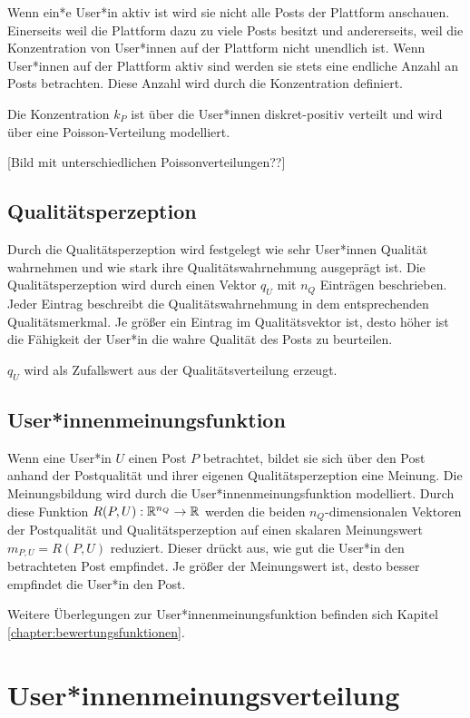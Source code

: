 Wenn ein*e User*in aktiv ist wird sie nicht alle Posts der Plattform anschauen. Einerseits weil die Plattform dazu zu viele Posts besitzt und andererseits, weil die Konzentration von User*innen auf der Plattform nicht unendlich ist. Wenn User*innen auf der Plattform aktiv sind werden sie stets eine endliche Anzahl an Posts betrachten. Diese Anzahl wird durch die Konzentration definiert.

Die Konzentration $k_P$ ist über die User*innen diskret-positiv verteilt und wird über eine Poisson-Verteilung modelliert.

[Bild mit unterschiedlichen Poissonverteilungen??]

\subsection{Qualitätsperzeption}
\label{uqualitaet}

Durch die Qualitätsperzeption wird festgelegt wie sehr User*innen Qualität wahrnehmen und wie stark ihre Qualitätswahrnehmung ausgeprägt ist. Die Qualitätsperzeption wird durch einen Vektor $q_U$ mit $n_Q$  Einträgen beschrieben. Jeder Eintrag beschreibt die Qualitätswahrnehmung in dem entsprechenden Qualitätsmerkmal. Je größer ein Eintrag im Qualitätsvektor ist, desto höher ist die Fähigkeit der User*in die wahre Qualität des Posts zu beurteilen.

$q_U$ wird als Zufallswert aus der Qualitätsverteilung erzeugt.

\subsection{User*innenmeinungsfunktion}

Wenn eine User*in $U$ einen Post $P$ betrachtet, bildet sie sich über den Post anhand der Postqualität und ihrer eigenen Qualitätsperzeption eine Meinung. Die Meinungsbildung wird durch die User*innenmeinungsfunktion modelliert. Durch diese Funktion $R(P,U): \mathbb{R}^{n_Q} \rightarrow \mathbb{R} $ werden die beiden $n_Q$-dimensionalen Vektoren der Postqualität und Qualitätsperzeption auf einen skalaren Meinungswert $m_{P,U} = R(P,U)$ reduziert. Dieser drückt aus, wie gut die User*in den betrachteten Post empfindet. Je größer der Meinungswert ist, desto besser empfindet die User*in den Post.

Weitere Überlegungen zur User*innenmeinungsfunktion befinden sich Kapitel \ref{chapter:bewertungsfunktionen}.

\section{User*innenmeinungsverteilung}


